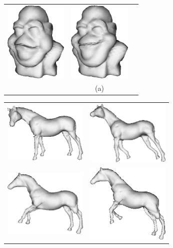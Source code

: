 \begin{figure}
\begin{center}
\begin{tabular}{ccc}
\includegraphics[width=3cm]{../images/dispanim_5} &
\includegraphics[width=3cm]{../images/dispanim_6} \\
& (a) &
\end{tabular}
\begin{tabular}{cc}
\includegraphics[width=4cm]{../images/horse_dispanim2} &
\includegraphics[width=4cm]{../images/horse_dispanim3} \\
\includegraphics[width=4cm]{../images/horse_dispanim4} &
\includegraphics[width=4cm]{../images/horse_dispanim5} \\

\end{tabular}
\end{center}
\end{figure}
